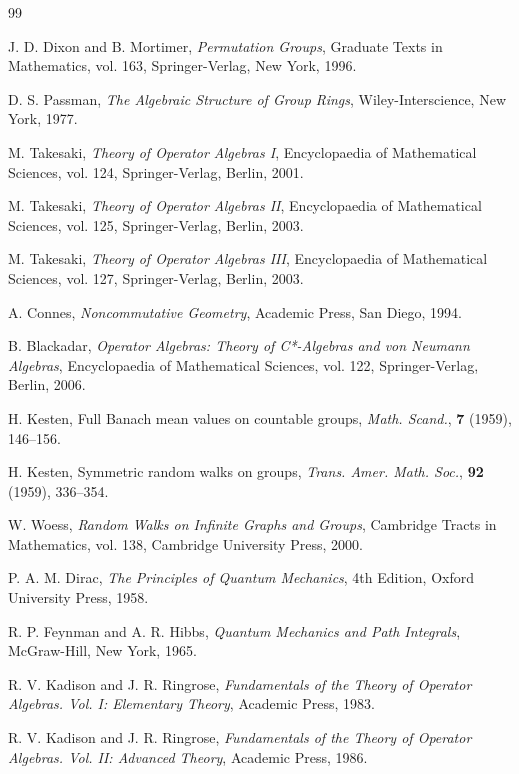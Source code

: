 \documentclass[12pt,a4paper]{ltjarticle}
\theoremstyle{definition}
\begin{document}
\pagebreak
\begin{thebibliography}{99}

J. D. Dixon and B. Mortimer, \textit{Permutation Groups}, Graduate Texts in Mathematics, vol. 163, Springer-Verlag, New York, 1996.

D. S. Passman, \textit{The Algebraic Structure of Group Rings}, Wiley-Interscience, New York, 1977.

M. Takesaki, \textit{Theory of Operator Algebras I}, Encyclopaedia of Mathematical Sciences, vol. 124, Springer-Verlag, Berlin, 2001.

M. Takesaki, \textit{Theory of Operator Algebras II}, Encyclopaedia of Mathematical Sciences, vol. 125, Springer-Verlag, Berlin, 2003.

M. Takesaki, \textit{Theory of Operator Algebras III}, Encyclopaedia of Mathematical Sciences, vol. 127, Springer-Verlag, Berlin, 2003.

A. Connes, \textit{Noncommutative Geometry}, Academic Press, San Diego, 1994.

B. Blackadar, \textit{Operator Algebras: Theory of C*-Algebras and von Neumann Algebras}, Encyclopaedia of Mathematical Sciences, vol. 122, Springer-Verlag, Berlin, 2006.

H. Kesten, Full Banach mean values on countable groups, \textit{Math. Scand.}, \textbf{7} (1959), 146--156.

H. Kesten, Symmetric random walks on groups, \textit{Trans. Amer. Math. Soc.}, \textbf{92} (1959), 336--354.

W. Woess, \textit{Random Walks on Infinite Graphs and Groups}, Cambridge Tracts in Mathematics, vol. 138, Cambridge University Press, 2000.

P. A. M. Dirac, \textit{The Principles of Quantum Mechanics}, 4th Edition, Oxford University Press, 1958.

R. P. Feynman and A. R. Hibbs, \textit{Quantum Mechanics and Path Integrals}, McGraw-Hill, New York, 1965.

R. V. Kadison and J. R. Ringrose, \textit{Fundamentals of the Theory of Operator Algebras. Vol. I: Elementary Theory}, Academic Press, 1983.

R. V. Kadison and J. R. Ringrose, \textit{Fundamentals of the Theory of Operator Algebras. Vol. II: Advanced Theory}, Academic Press, 1986.


\end{thebibliography}
\end{document}
